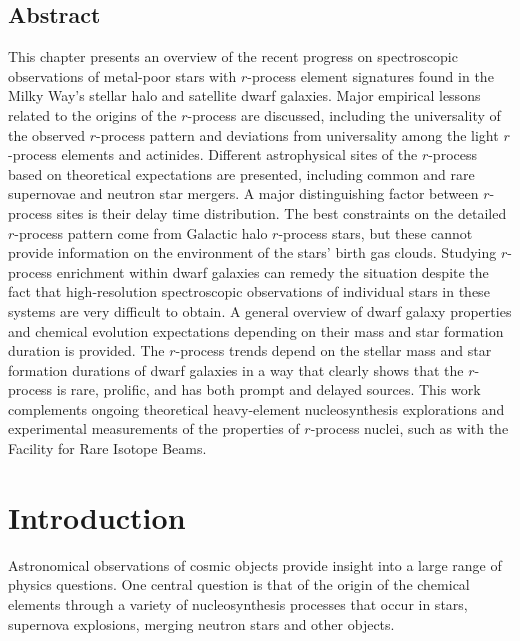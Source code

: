 \documentclass[letterpaper]{article}
\begin{document}
\begin{center}
\section*{Abstract} 

This chapter presents an overview of the recent progress on spectroscopic observations of metal-poor stars with $r$-process element signatures found in the Milky Way’s stellar halo and satellite dwarf galaxies.
Major empirical lessons related to the origins of the $r$-process are discussed, including the universality of the observed $r$-process pattern and deviations from universality among the light $r$-process elements and actinides. Different astrophysical sites of the $r$-process based on theoretical expectations are presented, including common and rare supernovae and neutron star mergers. A major distinguishing factor between $r$-process sites is their delay time distribution. The best constraints on the detailed $r$-process pattern come from Galactic halo $r$-process stars, but these cannot provide information on the environment of the stars' birth gas clouds. Studying $r$-process enrichment within dwarf galaxies can remedy the situation despite the fact that high-resolution spectroscopic observations of individual stars in these systems are very difficult to obtain. A general overview of dwarf galaxy properties and chemical evolution expectations depending on their mass and star formation duration is provided. The $r$-process trends depend on the stellar mass and star formation durations of dwarf galaxies in a way that clearly shows that the $r$-process is rare, prolific, and has both prompt and delayed sources. This work complements ongoing theoretical heavy-element nucleosynthesis explorations and experimental measurements of the properties of $r$-process nuclei, such as with the Facility for Rare Isotope Beams.

\end{center}








\newpage
\section{Introduction}

Astronomical observations of cosmic objects provide insight into a large range of physics questions. One central question is that of the origin of the chemical elements through a variety of nucleosynthesis processes that occur in stars, supernova explosions, merging neutron stars and other objects. 
\end{document}
